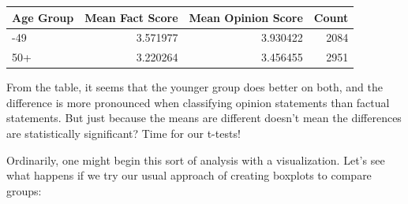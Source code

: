 \documentclass[
  letterpaper,
]{book}
\begin{document}
\begin{longtable}[]{@{}lrrr@{}}
\toprule\noalign{}
Age Group & Mean Fact Score & Mean Opinion Score & Count \\
\midrule\noalign{}
\endhead
\bottomrule\noalign{}
\endlastfoot
18-49 & 3.571977 & 3.930422 & 2084 \\
50+ & 3.220264 & 3.456455 & 2951 \\
\end{longtable}

From the table, it seems that the younger group does better on both, and
the difference is more pronounced when classifying opinion statements
than factual statements. But just because the means are different
doesn't mean the differences are statistically significant? Time for our
t-tests!

\begin{tcolorbox}[enhanced jigsaw, colframe=quarto-callout-tip-color-frame, breakable, arc=.35mm, bottomtitle=1mm, bottomrule=.15mm, colbacktitle=quarto-callout-tip-color!10!white, rightrule=.15mm, colback=white, opacityback=0, opacitybacktitle=0.6, coltitle=black, left=2mm, toptitle=1mm, toprule=.15mm, titlerule=0mm, leftrule=.75mm, title=\textcolor{quarto-callout-tip-color}{\faLightbulb}\hspace{0.5em}{Data Storytelling: When Good Graphs Go Bad}]

Ordinarily, one might begin this sort of analysis with a visualization.
Let's see what happens if we try our usual approach of creating boxplots
to compare groups:


\end{tcolorbox}
\end{document}
